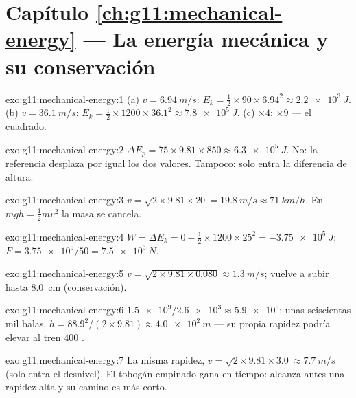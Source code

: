 \section*{Capítulo \ref{ch:g11:mechanical-energy} --- La energía mecánica y su conservación}

\begin{solution}{exo:g11:mechanical-energy:1}
(a) $v = \qty{6.94}{m/s}$:
$E_k = \tfrac12 \times 90 \times 6.94^2 \approx \qty{2.2e3}{J}$.
(b) $v = \qty{36.1}{m/s}$:
$E_k = \tfrac12 \times 1200 \times 36.1^2 \approx \qty{7.8e5}{J}$.
(c) $\times 4$; $\times 9$ --- el cuadrado.
\end{solution}

\begin{solution}{exo:g11:mechanical-energy:2}
$\Delta E_p = 75 \times 9.81 \times 850 \approx \qty{6.3e5}{J}$. No: la
referencia desplaza por igual los dos valores. Tampoco: solo entra la
diferencia de altura.
\end{solution}

\begin{solution}{exo:g11:mechanical-energy:3}
$v = \sqrt{2 \times 9.81 \times 20} = \qty{19.8}{m/s} \approx
\qty{71}{km/h}$. En $mgh = \tfrac12 mv^2$ la masa se cancela.
\end{solution}

\begin{solution}{exo:g11:mechanical-energy:4}
$W = \Delta E_k = 0 - \tfrac12 \times 1200 \times 25^2 =
\qty{-3.75e5}{J}$; $F = \num{3.75e5}/50 = \qty{7.5e3}{N}$.
\end{solution}

\begin{solution}{exo:g11:mechanical-energy:5}
$v = \sqrt{2 \times 9.81 \times 0.080} \approx \qty{1.3}{m/s}$; vuelve a
subir hasta \qty{8.0}{cm} (conservación).
\end{solution}

\begin{solution}{exo:g11:mechanical-energy:6}
$\num{1.5e9}/\num{2.6e3} \approx \num{5.9e5}$: unas seiscientas mil
balas. $h = 88.9^2/(2 \times 9.81) \approx \qty{4.0e2}{m}$ --- su propia
rapidez podría elevar al tren $400$ .
\end{solution}

\begin{solution}{exo:g11:mechanical-energy:7}
La misma rapidez,
$v = \sqrt{2 \times 9.81 \times 3.0} \approx \qty{7.7}{m/s}$ (solo entra
el desnivel). El tobogán empinado gana en tiempo: alcanza antes una
rapidez alta y su camino es más corto.
\end{solution}

